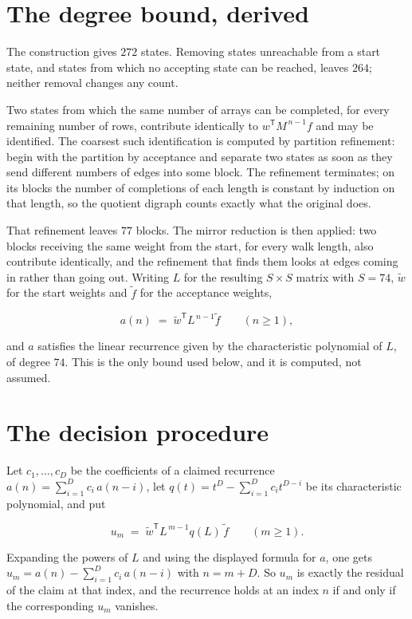 \documentclass[11pt]{article}
\theoremstyle{definition}
\begin{document}
\section{The degree bound, derived}

The construction gives $272$ states. Removing states unreachable from a start state, and states from which no accepting state can be reached, leaves $264$; neither removal changes any count.

Two states from which the same number of arrays can be completed, for every remaining number of rows, contribute identically to $w^{\mathsf T}M^{\,n-1}f$ and may be identified. The coarsest such identification is computed by partition refinement: begin with the partition by acceptance and separate two states as soon as they send different numbers of edges into some block. The refinement terminates; on its blocks the number of completions of each length is constant by induction on that length, so the quotient digraph counts exactly what the original does.

That refinement leaves $77$ blocks. The mirror reduction is then applied: two blocks receiving the same weight from the start, for every walk length, also contribute identically, and the refinement that finds them looks at edges coming in rather than going out. Writing $L$ for the resulting $S \times S$ matrix with $S = 74$, $\tilde w$ for the start weights and $\tilde f$ for the acceptance weights,

\[a(n) \;=\; \tilde w^{\mathsf T} L^{\,n-1} \tilde f \qquad (n \ge 1),\]

and $a$ satisfies the linear recurrence given by the characteristic polynomial of $L$, of degree $74$. This is the only bound used below, and it is computed, not assumed.

\section{The decision procedure}

Let $c_1,\dots,c_D$ be the coefficients of a claimed recurrence $a(n) = \sum_{i=1}^{D} c_i\,a(n-i)$, let $q(t) = t^{D} - \sum_{i=1}^{D} c_i t^{D-i}$ be its characteristic polynomial, and put

\[u_m \;=\; \tilde w^{\mathsf T} L^{\,m-1} q(L)\,\tilde f \qquad (m \ge 1).\]

Expanding the powers of $L$ and using the displayed formula for $a$, one gets $u_m = a(n) - \sum_{i=1}^{D} c_i\,a(n-i)$ with $n = m + D$. So $u_m$ is exactly the residual of the claim at that index, and the recurrence holds at an index $n$ if and only if the corresponding $u_m$ vanishes.
\end{document}
